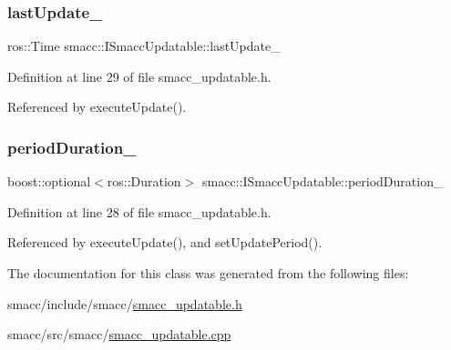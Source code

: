 \subsubsection{\texorpdfstring{last\+Update\+\_\+}{lastUpdate\_}}
{\footnotesize\ttfamily ros\+::\+Time smacc\+::\+I\+Smacc\+Updatable\+::last\+Update\+\_\+\hspace{0.3cm}{\ttfamily [private]}}



Definition at line 29 of file smacc\+\_\+updatable.\+h.



Referenced by execute\+Update().

\mbox{\label{classsmacc_1_1ISmaccUpdatable_ad02d9798ac5609f3ecb9fb8a46febc18}} 
\subsubsection{\texorpdfstring{period\+Duration\+\_\+}{periodDuration\_}}
{\footnotesize\ttfamily boost\+::optional$<$ros\+::\+Duration$>$ smacc\+::\+I\+Smacc\+Updatable\+::period\+Duration\+\_\+\hspace{0.3cm}{\ttfamily [private]}}



Definition at line 28 of file smacc\+\_\+updatable.\+h.



Referenced by execute\+Update(), and set\+Update\+Period().



The documentation for this class was generated from the following files\+:\begin{DoxyCompactItemize}
\item 
smacc/include/smacc/\hyperlink{smacc__updatable_8h}{smacc\+\_\+updatable.\+h}\item 
smacc/src/smacc/\hyperlink{smacc__updatable_8cpp}{smacc\+\_\+updatable.\+cpp}\end{DoxyCompactItemize}
